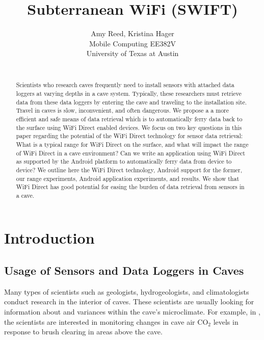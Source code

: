 \documentclass[10pt,twocolumn]{article}
\begin{document}
\title{Subterranean WiFi (SWIFT)}

\author{Amy Reed, Kristina Hager\\
Mobile Computing EE382V\\
University of Texas at Austin\\
\\
}

\maketitle
\thispagestyle{empty}

\begin{abstract}
	Scientists who research caves frequently need to install sensors with attached data loggers at varying depths in a cave system.
	Typically, these researchers must retrieve data from these data loggers by entering the cave and traveling to the installation site.
	Travel in caves is slow, inconvenient, and often dangerous.
	We propose a a more efficient and safe means of data retrieval which is to automatically ferry data back to the surface using WiFi Direct enabled devices. 
	We focus on two key questions in this paper regarding the potential of the WiFi Direct technology for sensor data retrieval:
	What is a typical range for WiFi Direct on the surface, and what will impact the range of WiFi Direct in a cave environment?
	Can we write an application using WiFi Direct as supported by the Android platform to automatically ferry data from device to device?
	We outline here the WiFi Direct technology, Android support for the former, our range experiments, Android application experiments, and results.
	We show that WiFi Direct has good potential for easing the burden of data retrieval from sensors in a cave.
\end{abstract}


\section{Introduction}

\subsection{Usage of Sensors and Data Loggers in Caves}
\label{sec:Usage of Sensors and Data Loggers in Caves}
Many types of scientists such as geologists, hydrogeologists, and climatologists conduct research in the interior of caves. 
These scientists are usually looking for information about and variances within the cave's microclimate. 
For example, in \cite{wong2010}, the scientists are interested in monitoring changes in cave air CO$_2$ levels in response to brush clearing in areas above the cave. 
\end{document}
